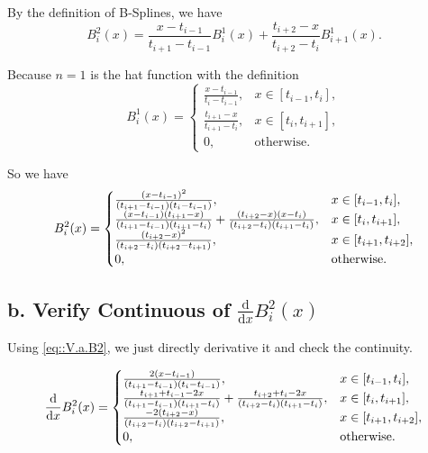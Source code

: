 \documentclass[a4paper]{article}
\begin{document}
By the definition of B-Splines, we have
\begin{equation}
    B_{i} ^{2}(x) = \frac{x - t_{i-1}}{t_{i+1} - t_{i-1}} B_{i} ^{1}(x) + \frac{t_{i+2} - x}{t_{i+2} - t _{i}} B_{i+1} ^{1}(x).
    \label{eq::IterationOfb2}
\end{equation}

Because $n=1$ is the hat function with the definition
\begin{equation}
    B_{i} ^{1}(x) =
    \begin{cases}
        \frac{x - t_{i-1}}{t_{i} - t_{i-1}}, & x \in [t_{i-1}, t_{i}],\\
        \frac{t_{i+1} - x}{t_{i+1} - t_{i}}, & x \in [t_{i}, t_{i+1}],\\
        0, & \text{otherwise}.
    \end{cases}
    \label{eq::V.a.hatfunction}
\end{equation}

So we have
\begin{equation}
    B_{i} ^{2}(x) =
    \begin{cases}
        \frac{\qty(x-t_{i-1})^2}{\qty(t_{i+1} - t_{i-1}) \qty(t_i - t_{i-1})}, & x \in [t_{i-1}, t_{i}],\\
        \frac{\qty(x-t_{i-1}) \qty(t_{i+1} - x)}{\qty(t_{i+1} - t_{i-1}) \qty(t_{i+1} - t_{i})} + \frac{\qty(t_{i+2} - x) \qty(x - t_i)}{\qty(t_{i+2} - t_{i}) \qty(t_{i+1} - t_{i})}, & x \in [t_{i}, t_{i+1}],\\
        \frac{\qty(t_{i+2} - x)^2}{\qty(t_{i+2} - t_{i}) \qty(t_{i+2} - t_{i+1})}, & x \in [t_{i+1}, t_{i+2}],\\
        0, & \text{otherwise}.
    \end{cases}
    \label{eq::V.a.B2}
\end{equation}


\subsection*{b. Verify Continuous of $\frac{\mathrm{d}}{\mathrm{d} x} B_i^2(x)$}

Using \eqref{eq::V.a.B2}, we just directly derivative it and check the continuity.

\begin{equation}
    \frac{\mathrm{d}}{\mathrm{d} x} B_i^2(x) = 
    \begin{cases}
        \frac{2\qty(x-t_{i-1})}{\qty(t_{i+1} - t_{i-1}) \qty(t_i - t_{i-1})}, & x \in [t_{i-1}, t_{i}],\\
        \frac{t_{i+1} + t_{i-1} - 2x}{\qty(t_{i+1} - t_{i-1}) \qty(t_{i+1} - t_{i})} + \frac{t_{i+2}+t_i - 2x}{\qty(t_{i+2} - t_{i}) \qty(t_{i+1} - t_{i})}, & x \in [t_{i}, t_{i+1}],\\
        \frac{-2\qty(t_{i+2} - x)}{\qty(t_{i+2} - t_{i}) \qty(t_{i+2} - t_{i+1})}, & x \in [t_{i+1}, t_{i+2}],\\
        0, & \text{otherwise}.
    \end{cases}
    \label{eq::derivativeOfB2}
\end{equation}
\end{document}
